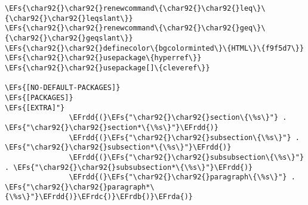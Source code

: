 \documentclass[c]{article}
\theoremstyle{plain}%
\theoremstyle{definition}
\theoremstyle{remark}
\newcommand{\EFs}[1]{\textcolor{EFs}{#1}} %
\newcommand{\EFrda}[1]{\textcolor{EFrda}{#1}} %
\newcommand{\EFrdb}[1]{\textcolor{EFrdb}{#1}} %
\newcommand{\EFrdc}[1]{\textcolor{EFrdc}{#1}} %
\newcommand{\EFrdd}[1]{\textcolor{EFrdd}{#1}} %
\begin{document}
\begin{Code}
\begin{Verbatim}
\EFs{\char92{}\char92{}renewcommand\{\char92{}\char92{}leq\}\{\char92{}\char92{}leqslant\}}
\EFs{\char92{}\char92{}renewcommand\{\char92{}\char92{}geq\}\{\char92{}\char92{}geqslant\}}
\EFs{\char92{}\char92{}definecolor\{bgcolorminted\}\{HTML\}\{f9f5d7\}}
\EFs{\char92{}\char92{}usepackage\{hyperref\}}
\EFs{\char92{}\char92{}usepackage[]\{cleveref\}}

\EFs{[NO-DEFAULT-PACKAGES]}
\EFs{[PACKAGES]}
\EFs{[EXTRA]"}
               \EFrdd{(}\EFs{"\char92{}\char92{}section\{\%s\}"} . \EFs{"\char92{}\char92{}section*\{\%s\}"}\EFrdd{)}
               \EFrdd{(}\EFs{"\char92{}\char92{}subsection\{\%s\}"} . \EFs{"\char92{}\char92{}subsection*\{\%s\}"}\EFrdd{)}
               \EFrdd{(}\EFs{"\char92{}\char92{}subsubsection\{\%s\}"} . \EFs{"\char92{}\char92{}subsubsection*\{\%s\}"}\EFrdd{)}
               \EFrdd{(}\EFs{"\char92{}\char92{}paragraph\{\%s\}"} . \EFs{"\char92{}\char92{}paragraph*\{\%s\}"}\EFrdd{)}\EFrdc{)}\EFrdb{)}\EFrda{)}
\end{Verbatim}
\end{Code}
\end{document}
